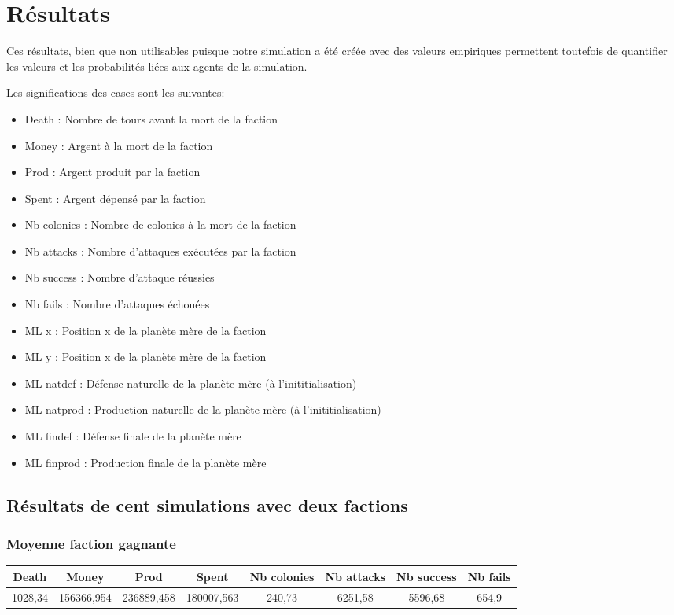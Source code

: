 \chapter{Résultats}
Ces résultats, bien que non utilisables puisque notre simulation a été créée avec des valeurs empiriques permettent toutefois de quantifier les valeurs et les probabilités liées aux agents de la simulation.

Les significations des cases sont les suivantes:

\begin{itemize}
\item Death : Nombre de tours avant la mort de la faction
\item Money : Argent à la mort de la faction
\item Prod : Argent produit par la faction
\item Spent : Argent dépensé par la faction
\item Nb colonies : Nombre de colonies à la mort de la faction
\item Nb attacks : Nombre d’attaques exécutées par la faction
\item Nb success : Nombre d’attaque réussies
\item Nb fails : Nombre d’attaques échouées\\

\item ML x : Position x de la planète mère de la faction
\item ML y : Position x de la planète mère de la faction
\item ML natdef : Défense naturelle de la planète mère (à l’inititialisation)
\item ML natprod : Production naturelle de la planète mère (à l’inititialisation)
\item ML findef : Défense finale de la planète mère
\item ML finprod : Production finale de la planète mère
\end{itemize}

\section{Résultats de cent simulations avec deux factions}
\subsection{Moyenne faction gagnante}

\begin{tabular}{|c|c|c|c|c|c|c|c|}
	\hline Death & Money & Prod & Spent & Nb colonies & Nb attacks & Nb success & Nb fails \\ 
	\hline 1028,34 & 156366,954 & 236889,458 & 180007,563 & 240,73 & 6251,58 & 5596,68 & 654,9 \\
	\hline
\end{tabular}


